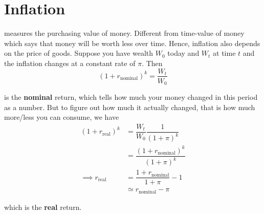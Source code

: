 \section{Inflation}
 measures the purchasing value of money. Different from time-value of money which says that money will be worth less over time. Hence, inflation also depends on the price of goods. Suppose you have wealth \(W_0\) today and \(W_t\) at time \(t\) and the inflation changes at a constant rate of \(\pi\). Then 
 \begin{equation*}
    \left(1+ r_{\mathrm{nominal}} \right)^k = \dfrac{W_t}{W_0}
 \end{equation*}

 is the \textbf{nominal} return, which tells how much your money changed in this period as a number. But to figure out how much it actually changed, that is how much more/less you can consume, we have 
 \begin{align*}
    \left( 1+ r_{\mathrm{real}} \right)^k &= \dfrac{W_t}{W_0} \dfrac{1}{(1 + \pi)^k} \\
    &= \dfrac{(1+ r_{\mathrm{nominal}})^k}{(1 + \pi)^k} \\
    \implies  r_{\mathrm{real}} &= \dfrac{1+ r_{\mathrm{nominal}}}{1 + \pi} - 1 \\
    & \simeq r_{\mathrm{nominal}} - \pi
 \end{align*}
 
 which is the \textbf{real} return. 